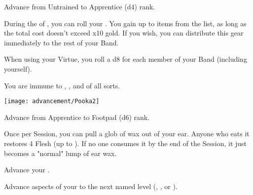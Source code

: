 \begin{multicols*}{2}



Advance  from Untrained to Apprentice (d4) rank.


During the  of , you can roll your \LUCK. You gain up to \SUM items from the  list, as long as the total cost doesn't exceed \SUM x10 gold.  If you wish, you can distribute this gear immediately to the rest of your Band.


When using your  Virtue, you roll a d8 for each member of your Band (including yourself).


You are immune to , , and  of all sorts.

\begin{center}
\texttt{[image: advancement/Pooka2]}
\end{center}

\newpage


Advance  from Apprentice to Footpad (d6) rank.



Once per Session, you can pull a glob of wax out of your ear.  Anyone who eats it restores 4 Flesh (up to \MAX). If no one consumes it by the end of the Session, it just becomes a "normal" lump of ear wax.


Advance your  \DCUP.


Advance  aspects of your  to the next named level (\DEATH, \INJURY, or \INSANITY).


\end{multicols*}
